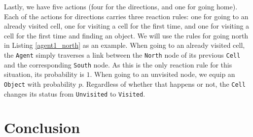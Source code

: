 \documentclass[runningheads]{llncs}
\begin{document}
Lastly, we have five actions (four for the directions, and one for
going home). Each of the actions for directions carries three reaction
rules: one for going to an already visited cell, one for visiting a
cell for the first time, and one for visiting a cell for the
first time and finding an object. We will use the rules for going north
in Listing \ref{agent1_north} as an example. When going to an already visited
cell, the \texttt{Agent} simply traverses a link between the \texttt{North} node
of its previous \texttt{Cell} and the corresponding \texttt{South} node. As this
is the only reaction rule for this situation, its probability is $1$. When
going to an unvisited node, we equip an \texttt{Object} with probability $p$.
Regardless of whether that happens or not, the \texttt{Cell} changes its
status from \texttt{Unvisited} to \texttt{Visited}. %

\section{Conclusion}



\end{document}
